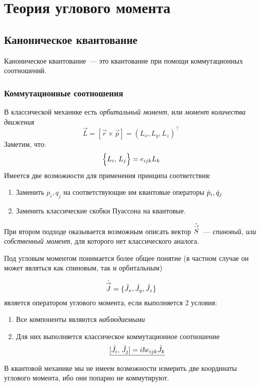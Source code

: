 \chapter{Теория углового момента}
\section{Каноническое квантование}
Каноническое квантование~--- это квантование при помощи коммутационных соотношений.

\subsection{Коммутационные соотношения}
\Reminder В классической механике есть \emph{орбитальный момент}, или \emph{момент количества движения}
$$
    \vec L = [\vec r \times \vec p] = (L_x, L_y, L_z)^\top
$$
Заметим, что:
$$
    \Pois{L_i}{L_j} = e_{ijk} L_k
$$
Имеется две возможности для применения принципа соответствия:
\begin{enumerate}
  \item Заменить $p_i, q_j$ на соответствующие им квантовые операторы $\Hat p_i, \Hat q_j$
  \item Заменить классические скобки Пуассона на квантовые.
\end{enumerate}

При втором подходе оказывается возможным описать вектор $\Hat{\vec S}$~--- \emph{спиновый, или собственный момент}, для которого нет классического аналога.

Под угловым моментом понимается более общее понятие (в частном случае он может являться как спиновым, так и орбитальным)

\Def
\newcommand{\hvec}[1]{\hat{\vec #1}}
$$
    \hvec J = \{\Hat J_x, \Hat J_y, \Hat J_z\}
$$
является оператором углового момента, если выполняется 2 условия:
\begin{enumerate}
  \item Все компоненты являются \emph{наблюдаемыми}
  \item Для них выполняется классическое коммутационное соотношение
  $$
\underline{    [\Hat J_i, \, \Hat J_j] = i \hbar e_{ijk} \Hat J_k}
  $$
\end{enumerate}
\Rem В квантовой механике мы не имеем возможности измерить две координаты углового момента, ибо они попарно не коммутируют.

